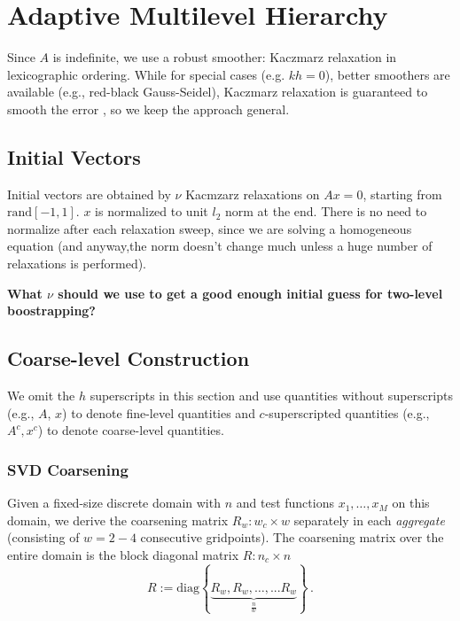 \documentclass{article}
\begin{document}
\section{Adaptive Multilevel Hierarchy}
Since $A$ is indefinite, we use a robust smoother: Kaczmarz relaxation in lexicographic ordering. While for special cases (e.g. $k h = 0$), better smoothers are available (e.g., red-black Gauss-Seidel), Kaczmarz relaxation is guaranteed to smooth the error \cite{amg_theory}, so we keep the approach general.

\subsection{Initial Vectors}
Initial vectors are obtained by $\nu$ Kacmzarz relaxations on $A x = 0$, starting from $\text{rand}[-1, 1]$. $x$ is normalized to unit $l_2$ norm at the end. There is no need to normalize after each relaxation sweep, since we are solving a homogeneous equation (and anyway,the norm doesn't change much unless a huge number of relaxations is performed). 

{\bf What $\nu$ should we use to get a good enough initial guess for two-level boostrapping?}

\subsection{Coarse-level Construction}
We omit the $h$ superscripts in this section and use quantities without superscripts (e.g., $A$, $x$) to denote fine-level quantities and $c$-superscripted quantities (e.g., $A^c, x^c$) to denote coarse-level quantities.

\subsubsection{SVD Coarsening}
Given a fixed-size discrete domain with $n$ and test functions $x_1,\dots,x_M$ on this domain, we derive the coarsening matrix $R_w: w_c \times w$ separately in each \emph{aggregate} (consisting of $w = 2-4$ consecutive gridpoints). The coarsening matrix over the entire domain is the block diagonal matrix $R: n_c \times n$
\begin{equation}
	R := \text{diag} \left\{ \underbrace{R_w, R_w, \dots, ... R_w }_{\frac{n}{w}}  \right\} \,.
\end{equation}
\end{document}
